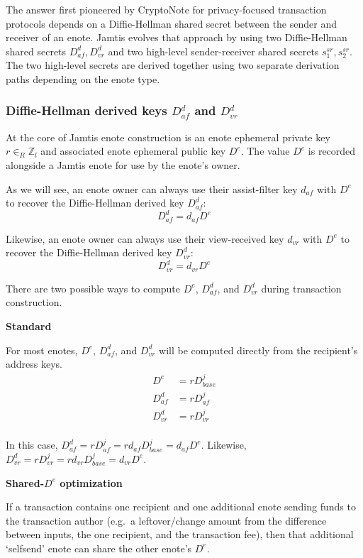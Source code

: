 The answer first pioneered by CryptoNote \cite{cryptoNoteWhitePaper} for privacy-focused transaction protocols depends on a Diffie-Hellman shared secret between the sender and receiver of an enote. Jamtis evolves that approach by using two Diffie-Hellman shared secrets $D^d_{af}, D^d_{vr}$ and two high-level sender-receiver shared secrets $s^{sr}_1, s^{sr}_2$. The two high-level secrets are derived together using two separate derivation paths depending on the enote type.

\subsubsection{Diffie-Hellman derived keys $D^d_{af}$ and $D^d_{vr}$}
\label{subsubsec:jamtis-srsecret-DH-derived-key}

At the core of Jamtis enote construction is an enote ephemeral private key $r \in_R \mathbb{Z}_l$ and associated enote ephemeral public key $D^e$. The value $D^e$ is recorded alongside a Jamtis enote for use by the enote's owner.

As we will see, an enote owner can always use their assist-filter key $d_{af}$ with $D^e$ to recover the Diffie-Hellman derived key $D^d_{af}$:
\[ D^d_{af} = d_{af} D^e \]

Likewise, an enote owner can always use their view-received key $d_{vr}$ with $D^e$ to recover the Diffie-Hellman derived key $D^d_{vr}$:
\[ D^d_{vr} = d_{vr} D^e \]

There are two possible ways to compute $D^e$, $D^d_{af}$, and $D^d_{vr}$ during transaction construction.

\textbf{Standard}

For most enotes, $D^e$, $D^d_{af}$, and $D^d_{vr}$ will be computed directly from the recipient's address keys.\vspace{.115cm}
\begin{align*}
    D^e      &= r D^j_{base} \\
    D^d_{af} &= r D^j_{af} \\
    D^d_{vr} &= r D^j_{vr} \\
\end{align*}

In this case, $D^d_{af} = r D^j_{af} = r d_{af} D^j_{base} = d_{af} D^e$. Likewise, $D^d_{vr} = r D^j_{vr} = r d_{vr} D^j_{base} = d_{vr} D^e$.

\textbf{Shared-$D^e$ optimization}

If a transaction contains one recipient and one additional enote sending funds to the transaction author (e.g.\ a leftover/change amount from the difference between inputs, the one recipient, and the transaction fee), then that additional `selfsend' enote can share the other enote's $D^e$.

